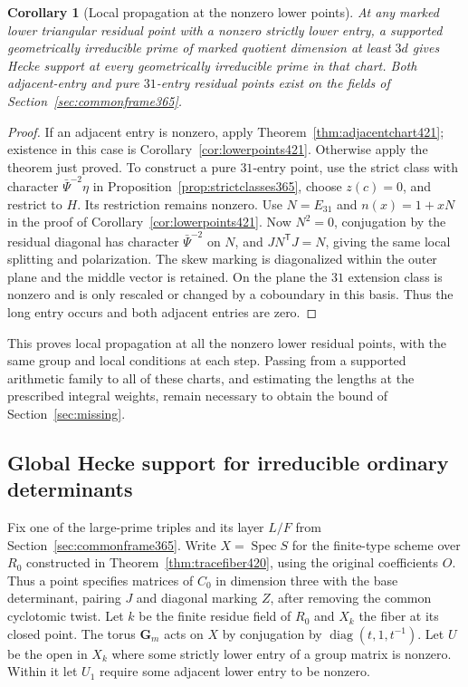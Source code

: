 \documentclass[a4paper,11pt]{article}
\newtheorem{corollary}[proposition]{Corollary}
\theoremstyle{definition}
\theoremstyle{remark}
\numberwithin{equation}{section}
\begin{document}
\begin{corollary}[Local propagation at the nonzero lower points]\leavevmode
\label{cor:alllowercharts422}
At any marked lower triangular residual point with a nonzero
strictly lower entry, a supported geometrically irreducible
prime of marked quotient dimension at least \(3d\) gives
Hecke support at every geometrically irreducible prime in
that chart. Both adjacent-entry and pure \(31\)-entry residual
points exist on the fields of Section~\ref{sec:commonframe365}.
\end{corollary}
\begin{proof}
If an adjacent entry is nonzero, apply
Theorem~\ref{thm:adjacentchart421}; existence in this case
is Corollary~\ref{cor:lowerpoints421}. Otherwise apply the
theorem just proved. To construct a pure \(31\)-entry point,
use the strict class with character \(\bar\Psi^{-2}\eta\) in
Proposition~\ref{prop:strictclasses365}, choose \(z(c)=0\),
and restrict to \(H\). Its restriction remains nonzero.
Use \(N=E_{31}\) and \(n(x)=1+xN\) in the proof of
Corollary~\ref{cor:lowerpoints421}. Now \(N^2=0\), conjugation
by the residual diagonal has character \(\bar\Psi^{-2}\)
on \(N\), and \(JN^{\mathsf T}J=N\), giving the same local
splitting and polarization. The skew marking is diagonalized
within the outer plane and the middle vector is retained.
On the plane the \(31\) extension class is nonzero and is
only rescaled or changed by a coboundary in this basis. Thus
the long entry occurs and both adjacent entries are zero.
\end{proof}

This proves local propagation at all the nonzero lower residual
points, with the same group and local conditions at each step.
Passing from a supported arithmetic family to all of these
charts, and estimating the lengths at the prescribed integral
weights, remain necessary to obtain the bound of
Section~\ref{sec:missing}.


\subsection{Global Hecke support for irreducible ordinary determinants}
\label{sec:globalheckesupport423}

Fix one of the large-prime triples and its layer \(L/F\) from
Section~\ref{sec:commonframe365}. Write \(X=\operatorname{Spec} S\)
for the finite-type scheme over \(R_0\) constructed in
Theorem~\ref{thm:tracefiber420}, using the original coefficients
\(O\). Thus a point specifies matrices of \(C_0\) in dimension
three with the base determinant, pairing \(J\) and diagonal
marking \(Z\), after removing the common cyclotomic twist.
Let \(k\) be the finite residue field of \(R_0\) and \(X_k\)
the fiber at its closed point. The torus \(\mathbf G_m\)
acts on \(X\) by conjugation by
\(\operatorname{diag}(t,1,t^{-1})\). Let \(U\) be the open in
\(X_k\) where some strictly lower entry of a group matrix is
nonzero. Within it let \(U_1\) require some adjacent lower
entry to be nonzero.
\end{document}
